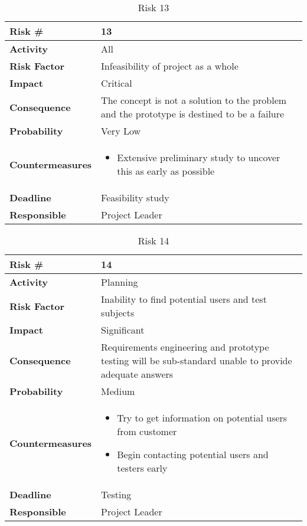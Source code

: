 \medskip

\begin{table}
\begin{tabularx}{\textwidth}{ | l | X | }
\hline
\textbf{Risk \#} & 13 \\ \hline
\textbf{Activity} & All \\ \hline
\textbf{Risk Factor} & Infeasibility of project as a whole \\ \hline
\textbf{Impact} & Critical \\ \hline
\textbf{Consequence} & The concept is not a solution to the problem and the prototype is destined to be a failure \\ \hline
\textbf{Probability} & Very Low \\ \hline
\textbf{Countermeasures} & \begin{itemize}
  \item Extensive preliminary study to uncover this as early as possible
\end{itemize}  \\ \hline
\textbf{Deadline} & Feasibility study \\ \hline
\textbf{Responsible} & Project Leader \\ \hline
\end{tabularx}
\caption{Risk 13}
\end{table}

\medskip

\begin{table}
\begin{tabularx}{\textwidth}{ | l | X | }
\hline
\textbf{Risk \#} & 14 \\ \hline
\textbf{Activity} & Planning \\ \hline
\textbf{Risk Factor} & Inability to find potential users and test subjects \\ \hline
\textbf{Impact} & Significant \\ \hline
\textbf{Consequence} & Requirements engineering and prototype testing will be sub-standard unable to provide adequate answers \\ \hline
\textbf{Probability} & Medium \\ \hline
\textbf{Countermeasures} & \begin{itemize}
  \item Try to get information on potential users from customer
  \item Begin contacting potential users and testers early
\end{itemize}  \\ \hline
\textbf{Deadline} & Testing \\ \hline
\textbf{Responsible} & Project Leader \\ \hline
\end{tabularx}
\caption{Risk 14}
\end{table}

